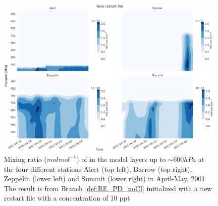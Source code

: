 \begin{figure}[h]
    \centering
    \includegraphics[width=\linewidth]{Chapter6_Results/images/vertHBr_newRestart.png}
    \caption{Mixing ratio ($mol mol^{-1}$) of  in the model layers up to $\sim 600 hPa$ at the four different stations Alert (top left), Barrow (top right), Zeppelin (lower left) and Summit (lower right) in April-May, 2001. The result is from Branch \ref{def:BE_PD_noCl} initialized with a new restart file with a  concentration of 10 ppt}
    \label{fig:vertHBr_newRestart}
\end{figure}
